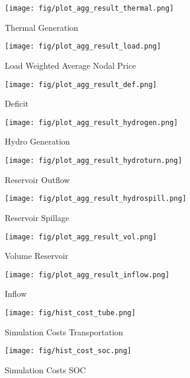 \documentclass{juliacon}
\begin{document}
\begin{figure}[H]
\centerline{\texttt{[image: fig/plot\_agg\_result\_thermal.png]}}
\label{fig:plot_agg_result_thermal}
\caption{Thermal Generation}
\end{figure}

\begin{figure}[H]
\centerline{\texttt{[image: fig/plot\_agg\_result\_load.png]}}
\caption{Load Weighted Average Nodal Price}
\label{fig:plot_agg_result_load}
\end{figure}

\begin{figure}[H]
\centerline{\texttt{[image: fig/plot\_agg\_result\_def.png]}}
\caption{Deficit}
\label{fig:plot_agg_result_def}
\end{figure}

\begin{figure}[H]
\centerline{\texttt{[image: fig/plot\_agg\_result\_hydrogen.png]}}
\caption{Hydro Generation}
\label{fig:plot_agg_result_hydrogen}
\end{figure}

\begin{figure}[H]
\centerline{\texttt{[image: fig/plot\_agg\_result\_hydroturn.png]}}
\caption{Reservoir Outflow}
\label{fig:plot_agg_result_hydroturn}
\end{figure}

\begin{figure}[H]
\centerline{\texttt{[image: fig/plot\_agg\_result\_hydrospill.png]}}
\caption{Reservoir Spillage}
\label{fig:plot_agg_result_hydrospill}
\end{figure}

\begin{figure}[H]
\centerline{\texttt{[image: fig/plot\_agg\_result\_vol.png]}}
\caption{Volume Reservoir}
\label{fig:plot_agg_result_vol}
\end{figure}

\begin{figure}[H]
\centerline{\texttt{[image: fig/plot\_agg\_result\_inflow.png]}}
\caption{Inflow}
\label{fig:plot_agg_result_inflow}
\end{figure}

\begin{figure}[H]
\centerline{\texttt{[image: fig/hist\_cost\_tube.png]}}
\caption{Simulation Costs Transportation}
\label{fig:hist_cost_tube}
\end{figure}

\begin{figure}[H]
\centerline{\texttt{[image: fig/hist\_cost\_soc.png]}}
\caption{Simulation Costs SOC}
\label{fig:hist_cost_soc}
\end{figure}



\end{document}
